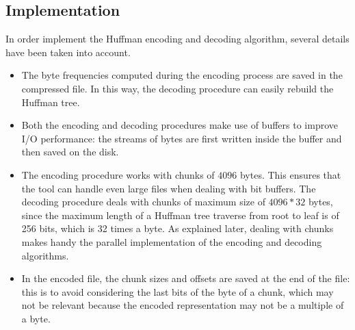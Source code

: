 \subsection{Implementation}
In order implement the Huffman encoding and decoding algorithm, several details have been taken into account.
\begin{itemize}
    \item The byte frequencies computed during the encoding process are saved in the compressed file. In this way, the decoding procedure can easily rebuild the Huffman tree.
    \item Both the encoding and decoding procedures make use of buffers to improve I/O performance: the streams of bytes are first written inside the buffer and then saved on the disk.
    \item The encoding procedure works with chunks of \(4096\) bytes. This ensures that the tool can handle even large files when dealing with bit buffers. The decoding procedure deals with chunks of maximum size of \(4096*32\) bytes, since the maximum length of a Huffman tree traverse from root to leaf is of 256 bits, which is 32 times a byte. As explained later, dealing with chunks makes handy the parallel implementation of the encoding and decoding algorithms.
    \item In the encoded file, the chunk sizes and offsets are saved at the end of the file: this is to avoid considering the last bits of the byte of a chunk, which may not be relevant because the encoded representation may not be a multiple of a byte.
\end{itemize}
